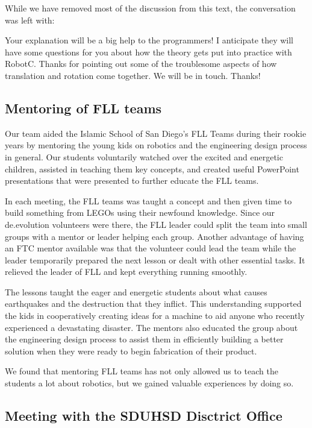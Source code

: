 While we have removed most of the discussion from this text, the conversation was left with:

\begin{fancyquotes}
Your explanation will be a big help to the programmers! I anticipate they will have some questions for you about how the theory gets put into practice with RobotC. Thanks for pointing out some of the troublesome aspects of how translation and rotation come together. We will be in touch. Thanks! 
\end{fancyquotes}

\subsection{Mentoring of FLL teams}
Our team aided the Islamic School of San Diego's FLL Teams during their rookie years by mentoring the young kids on robotics and the engineering design process in general. Our students voluntarily watched over the excited and energetic children, assisted in teaching them key concepts, and created useful PowerPoint presentations that were presented to further educate the FLL teams.

In each meeting, the FLL teams was taught a concept and then given time to build something from LEGOs using their newfound knowledge. Since our de.evolution volunteers were there, the FLL leader could split the team into small groups with a mentor or leader helping each group. Another advantage of having an FTC mentor available was that the volunteer could lead the team while the leader temporarily prepared the next lesson or dealt with other essential tasks. It relieved the leader of FLL and kept everything running smoothly.

The lessons taught the eager and energetic students about what causes earthquakes and the destruction that they inflict. This understanding supported the kids in cooperatively creating ideas for a machine to aid anyone who recently experienced a devastating disaster. The mentors also educated the group about the engineering design process to assist them in efficiently building a better solution when they were ready to begin fabrication of their product.

We found that mentoring FLL teams has not only allowed us to teach the students a lot about robotics, but we gained valuable experiences by doing so.

\subsection{Meeting with the SDUHSD Disctrict Office}

